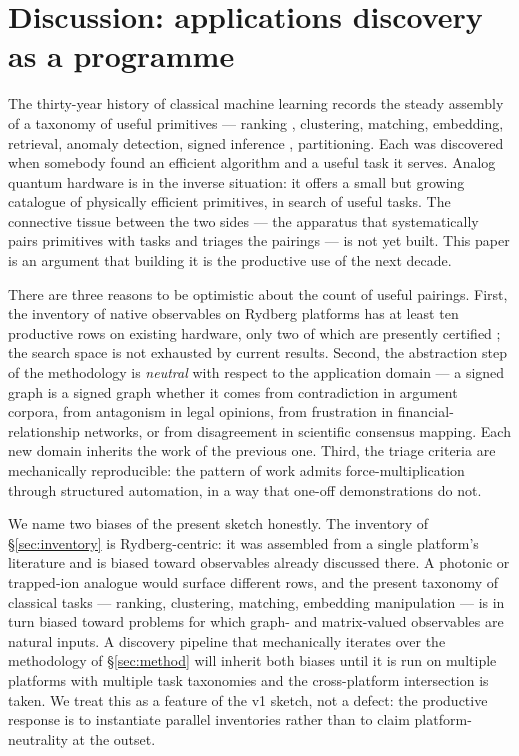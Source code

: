 \documentclass[10pt]{article}
\begin{document}
\section{Discussion: applications discovery as a programme}\label{sec:discussion}

The thirty-year history of classical machine learning records the steady assembly of a taxonomy of useful primitives --- ranking \cite{brin1998pagerank}, clustering, matching, embedding, retrieval, anomaly detection, signed inference \cite{tang2016signedsurvey}, partitioning. Each was discovered when somebody found an efficient algorithm and a useful task it serves. Analog quantum hardware is in the inverse situation: it offers a small but growing catalogue of physically efficient primitives, in search of useful tasks. The connective tissue between the two sides --- the apparatus that systematically pairs primitives with tasks and triages the pairings --- is not yet built. This paper is an argument that building it is the productive use of the next decade.

There are three reasons to be optimistic about the count of useful pairings. First, the inventory of native observables on Rydberg platforms has at least ten productive rows on existing hardware, only two of which are presently certified \cite{ebadi2022quantum,jurczak2026atomrank}; the search space is not exhausted by current results. Second, the abstraction step of the methodology is \emph{neutral} with respect to the application domain --- a signed graph is a signed graph whether it comes from contradiction in argument corpora, from antagonism in legal opinions, from frustration in financial-relationship networks, or from disagreement in scientific consensus mapping. Each new domain inherits the work of the previous one. Third, the triage criteria are mechanically reproducible: the pattern of work admits force-multiplication through structured automation, in a way that one-off demonstrations do not.

We name two biases of the present sketch honestly. The inventory of \S\ref{sec:inventory} is Rydberg-centric: it was assembled from a single platform's literature and is biased toward observables already discussed there. A photonic or trapped-ion analogue would surface different rows, and the present taxonomy of classical tasks --- ranking, clustering, matching, embedding manipulation --- is in turn biased toward problems for which graph- and matrix-valued observables are natural inputs. A discovery pipeline that mechanically iterates over the methodology of \S\ref{sec:method} will inherit both biases until it is run on multiple platforms with multiple task taxonomies and the cross-platform intersection is taken. We treat this as a feature of the v1 sketch, not a defect: the productive response is to instantiate parallel inventories rather than to claim platform-neutrality at the outset.
\end{document}
